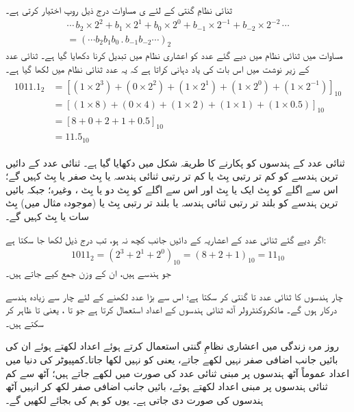 	 ثنائی نظامِ گنتی کے لئے ی مساوات   درج ذیل روپ اختیار کرتی ہے۔
\begin{multline}\label{مساوات_ثنائی_عمومی_روپ_ثنائی}
\cdots\, b_2\times 2^2+b_1\times 2^1+b_0\times 2^0+b_{-1}\times 2^{-1}+b_{-2}\times 2^{-2}\,\cdots\\
=(\cdots b_2b_1b_0\, .\, b_{-1}b_{-2}\cdots)_{2}
\end{multline}
	مساوات    میں ثنائی نظام میں دیے گئے عدد کو اعشاری نظام میں تبدیل کرنا دکھایا گیا ہے۔ ثنائی عدد کے زیر نوشت میں  اس بات کی یاد دہانی کراتا ہے کہ یہ عدد ثنائی نظام میں لکھا گیا ہے۔
\begin{gather} 
\begin{aligned}\label{مساوات_ثنائی_مثال}
1011.1_2&=[(1\times 2^3)+(0\times 2^2)+(1\times 2^1)+(1\times 2^0)+(1\times 2^{-1})]_{10}\\
&=[(1\times 8)+(0\times 4)+(1\times 2)+(1\times 1)+(1\times 0.5)]_{10}\\
&=[8+0+2+1+0.5]_{10}\\
&=11.5_{10}
\end{aligned}
\end{gather}
	
	 ثنائی عدد کے ہندسوں کو پکارنے کا طریقہ شکل   میں  دکھایا گیا ہے۔  ثنائی عدد  کے  دائیں ترین  ہندسے کو کم تر رتبی    بِٹ    یا کم تر رتبی   ثنائی ہندسہ یا  بِٹ صفر یا  بِٹ    کہیں گے؛  اس سے اگلے کو  بِٹ ایک یا بِٹ    اور اس سے اگلے کو بِٹ دو یا  بِٹ ،  وغیرہ؛ جبکہ بائیں  ترین  ہندسے کو بلند تر رتبی  ثنائی ہندسہ  یا بلند تر رتبی   بِٹ    یا (موجودہ مثال میں)     بِٹ سات یا  بِٹ    کہیں گے۔


	اگر دیے گئے ثنائی  عدد  کے  اعشاریہ کے دائیں جانب کچھ نہ ہو،  تب  درج ذیل لکھا جا سکتا  ہے:
\begin{align}
1011_2=(2^3+2^1+2^0)_{10}=(8+2+1)_{10}=11_{10}
\end{align}
 جو  ہندسے     ہیں، ان کے وزن جمع کیے  جاتے ہیں۔

چار ہندسوں کا  ثنائی عدد  تا    گنتی کر سکتا ہے؛   اس سے بڑا عدد   لکھنے  کے لئے  چار سے زیادہ ہندسے درکار ہوں گے۔ مائکروکنٹرولر آٹھ ثنائی ہندسوں کے اعداد استعمال کرتا ہے جو    تا ، یعنی  تا      ظاہر کر سکتے ہیں۔

روز مرہ  زندگی میں اعشاری نظامِ گنتی استعمال کرتے ہوئے اعداد لکھتے  ہوئے  ان کی  بائیں جانب اضافی  صفر نہیں لکھے جاتے،  یعنی  کو  نہیں لکھا جاتا۔کمپیوٹر کی دنیا میں اعداد عموماً آٹھ ہندسوں پر مبنی ثنائی عدد کی صورت میں لکھے جاتے ہیں؛ آٹھ سے کم ثنائی ہندسوں پر مبنی اعداد لکھتے  ہوئے،  بائیں جانب  اضافی صفر  لکھ کر انہیں    آٹھ ہندسوں کی صورت دی جاتی ہے۔ یوں  کو ہم    کی بجائے   لکھیں گے۔

